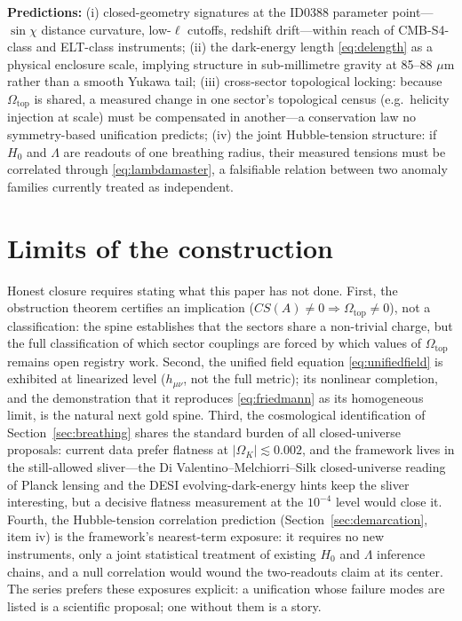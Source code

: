 \documentclass[11pt]{article}
\theoremstyle{remark}
\begin{document}
\textbf{Predictions:} (i) closed-geometry signatures at the ID0388 parameter point---$\sin\chi$ distance curvature, low-$\ell$ cutoffs, redshift drift---within reach of CMB-S4-class and ELT-class instruments; (ii) the dark-energy length \eqref{eq:delength} as a physical enclosure scale, implying structure in sub-millimetre gravity at 85--88 $\mu$m rather than a smooth Yukawa tail; (iii) cross-sector topological locking: because $\Omega_{\mathrm{top}}$ is shared, a measured change in one sector's topological census (e.g.\ helicity injection at scale) must be compensated in another---a conservation law no symmetry-based unification predicts; (iv) the joint Hubble-tension structure: if $H_0$ and $\Lambda$ are readouts of one breathing radius, their measured tensions must be correlated through \eqref{eq:lambdamaster}, a falsifiable relation between two anomaly families currently treated as independent.

\section{Limits of the construction}
\label{sec:limits}

Honest closure requires stating what this paper has not done. First, the obstruction theorem certifies an implication ($CS(A) \neq 0 \Rightarrow \Omega_{\mathrm{top}} \neq 0$), not a classification: the spine establishes that the sectors share a non-trivial charge, but the full classification of which sector couplings are forced by which values of $\Omega_{\mathrm{top}}$ remains open registry work. Second, the unified field equation \eqref{eq:unifiedfield} is exhibited at linearized level ($h_{\mu\nu}$, not the full metric); its nonlinear completion, and the demonstration that it reproduces \eqref{eq:friedmann} as its homogeneous limit, is the natural next gold spine. Third, the cosmological identification of Section~\ref{sec:breathing} shares the standard burden of all closed-universe proposals: current data prefer flatness at $|\Omega_K| \lesssim 0.002$, and the framework lives in the still-allowed sliver---the Di Valentino--Melchiorri--Silk closed-universe reading of Planck lensing and the DESI evolving-dark-energy hints keep the sliver interesting, but a decisive flatness measurement at the $10^{-4}$ level would close it. Fourth, the Hubble-tension correlation prediction (Section~\ref{sec:demarcation}, item iv) is the framework's nearest-term exposure: it requires no new instruments, only a joint statistical treatment of existing $H_0$ and $\Lambda$ inference chains, and a null correlation would wound the two-readouts claim at its center. The series prefers these exposures explicit: a unification whose failure modes are listed is a scientific proposal; one without them is a story.
\end{document}
